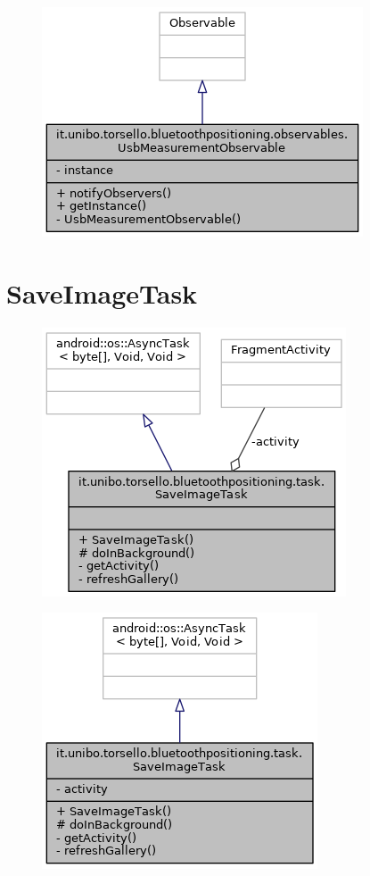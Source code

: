 \begin{figure}[ph]
	\centering
	\includegraphics[width=0.5\linewidth]{img/uml/class/classit_1_1unibo_1_1torsello_1_1bluetoothpositioning_1_1observables_1_1UsbMeasurementObservable__inherit__graph.png}
	\caption{}
\end{figure}

\newpage
\section{SaveImageTask}
\begin{figure}[ph]
	\centering
	\includegraphics[width=0.5\linewidth]{img/uml/class/classit_1_1unibo_1_1torsello_1_1bluetoothpositioning_1_1task_1_1SaveImageTask__coll__graph.png}
	\caption{}
\end{figure}

\begin{figure}[ph]
	\centering
	\includegraphics[width=0.5\linewidth]{img/uml/class/classit_1_1unibo_1_1torsello_1_1bluetoothpositioning_1_1task_1_1SaveImageTask__inherit__graph.png}
	\caption{}
\end{figure}

